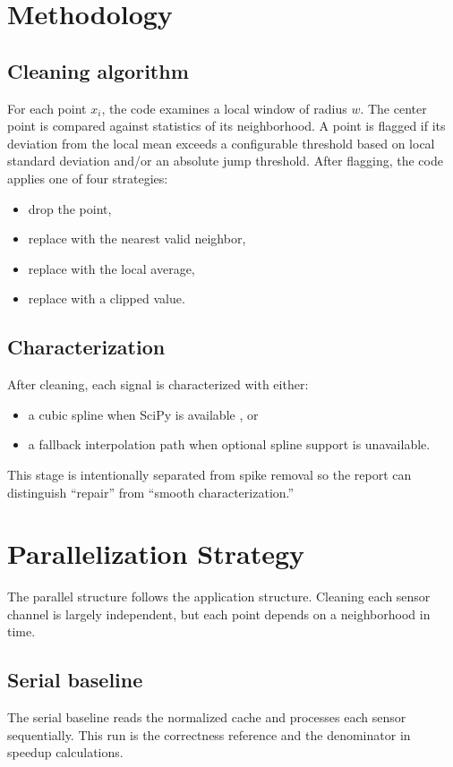 \documentclass[11pt]{article}
\begin{document}
\section{Methodology}
\subsection{Cleaning algorithm}
For each point $x_i$, the code examines a local window of radius $w$. The center point is compared against statistics of its neighborhood. A point is flagged if its deviation from the local mean exceeds a configurable threshold based on local standard deviation and/or an absolute jump threshold. After flagging, the code applies one of four strategies:
\begin{itemize}
  \item drop the point,
  \item replace with the nearest valid neighbor,
  \item replace with the local average,
  \item replace with a clipped value.
\end{itemize}

\subsection{Characterization}
After cleaning, each signal is characterized with either:
\begin{itemize}
  \item a cubic spline when SciPy is available \cite{virtanen2020scipy,scipy_cubicspline}, or
  \item a fallback interpolation path when optional spline support is unavailable.
\end{itemize}
This stage is intentionally separated from spike removal so the report can distinguish ``repair'' from ``smooth characterization.''

\section{Parallelization Strategy}
The parallel structure follows the application structure. Cleaning each sensor channel is largely independent, but each point depends on a neighborhood in time.

\subsection{Serial baseline}
The serial baseline reads the normalized cache and processes each sensor sequentially. This run is the correctness reference and the denominator in speedup calculations.
\end{document}
